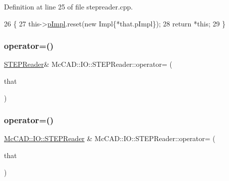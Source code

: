Definition at line 25 of file stepreader.\+cpp.


\begin{DoxyCode}
26                                \{
27   this->\hyperlink{classMcCAD_1_1IO_1_1STEPReader_a3bbb72987d6bad33c403c85401c62160}{pImpl}.reset(\textcolor{keyword}{new} Impl\{*that.pImpl\});
28   \textcolor{keywordflow}{return} *\textcolor{keyword}{this};
29 \}
\end{DoxyCode}
\mbox{\label{classMcCAD_1_1IO_1_1STEPReader_af3fbf37e7a0d30577aee40c2a3f3ccdb}} 
\subsubsection{\texorpdfstring{operator=()}{operator=()}\hspace{0.1cm}{\footnotesize\ttfamily [3/4]}}
{\footnotesize\ttfamily \hyperlink{classMcCAD_1_1IO_1_1STEPReader}{S\+T\+E\+P\+Reader}\& Mc\+C\+A\+D\+::\+I\+O\+::\+S\+T\+E\+P\+Reader\+::operator= (\begin{DoxyParamCaption}\item[{\hyperlink{classMcCAD_1_1IO_1_1STEPReader}{S\+T\+E\+P\+Reader} \&\&}]{that }\end{DoxyParamCaption})}

\mbox{\label{classMcCAD_1_1IO_1_1STEPReader_adf53dff13b4b21174d517992f101a909}} 
\subsubsection{\texorpdfstring{operator=()}{operator=()}\hspace{0.1cm}{\footnotesize\ttfamily [4/4]}}
{\footnotesize\ttfamily \hyperlink{classMcCAD_1_1IO_1_1STEPReader}{Mc\+C\+A\+D\+::\+I\+O\+::\+S\+T\+E\+P\+Reader} \& Mc\+C\+A\+D\+::\+I\+O\+::\+S\+T\+E\+P\+Reader\+::operator= (\begin{DoxyParamCaption}\item[{\hyperlink{classMcCAD_1_1IO_1_1STEPReader}{S\+T\+E\+P\+Reader} \&\&}]{that }\end{DoxyParamCaption})}



